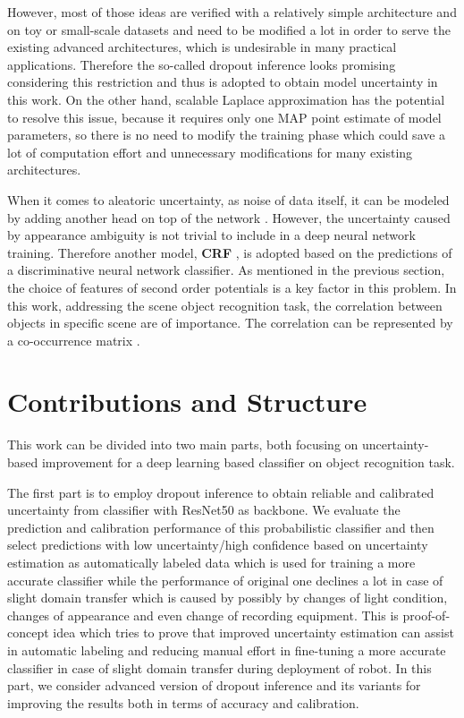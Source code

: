 However, most of those ideas are verified with a relatively simple architecture and on toy or small-scale datasets and need to be modified a lot in order to serve the existing advanced architectures, which is undesirable in many practical applications. Therefore the so-called dropout inference\cite{gal2016dropout} looks promising considering this restriction and thus is adopted to obtain model uncertainty in this work. On the other hand, scalable Laplace approximation \cite{ritter2018scalable} has the potential to resolve this issue, because it requires only one MAP point estimate of model parameters, so there is no need to modify the training phase which could save a lot of computation effort and unnecessary modifications for many existing architectures.

When it comes to aleatoric uncertainty, as noise of data itself, it can be modeled by adding another head on top of the network \cite{kendall2017uncertainties}. However, the uncertainty caused by appearance ambiguity is not trivial to include in a deep neural network training. Therefore another model, \textbf{CRF}
\cite{lafferty2001conditional}, is adopted based on the predictions of a discriminative neural network classifier. As mentioned in the previous section, the choice of features of second order potentials is a key factor in this problem. In this work, addressing the scene object recognition task, the correlation between objects in specific scene are of importance. The correlation can be represented by a co-occurrence matrix \cite{ladicky2010graph}\cite{rasiwasia2009holistic}\cite{galleguillos2008object}\cite{rabinovich2007objects}.

\section{Contributions and Structure}
This work can be divided into two main parts, both focusing on uncertainty-based improvement for a deep learning based classifier on object recognition task. 

The first part is to employ dropout inference to obtain reliable and calibrated uncertainty from classifier with ResNet50\cite{he2016deep} as backbone. We evaluate the prediction and calibration performance of this probabilistic classifier and then select predictions with low uncertainty/high confidence based on uncertainty estimation as automatically labeled data which is used for training a more accurate classifier while the performance of original one declines a lot in case of slight domain transfer which is caused by possibly by changes of light condition, changes of appearance and even change of recording equipment. This is proof-of-concept idea which tries to prove that improved uncertainty estimation can assist in automatic labeling and reducing manual effort in fine-tuning a more accurate classifier in case of slight domain transfer during deployment of robot. In this part, we consider advanced version of dropout inference and its variants for improving the results both in terms of accuracy and calibration. 

